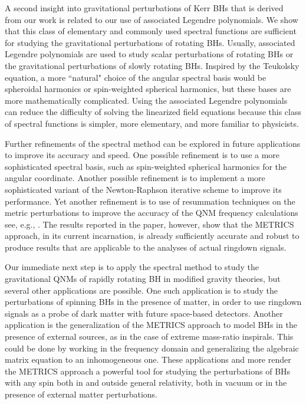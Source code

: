 \documentclass[aps,prx,amsmath,floats,floatfix,twocolumn,
  superscriptaddress,nofootinbib,showpacs]{revtex4-1}
\begin{document}
A second insight into gravitational perturbations of Kerr BHs that is derived from our work is related to our use of associated Legendre polynomials. We show that this class of elementary and commonly used spectral functions are sufficient for studying the gravitational perturbations of rotating BHs. 
Usually, associated Legendre polynomials are used to study scalar perturbations of rotating BHs or the gravitational perturbations of slowly rotating BHs. 
Inspired by the Teukolsky equation, a more ``natural" choice of the angular spectral basis would be spheroidal harmonics or spin-weighted spherical 
harmonics, but these bases are more mathematically complicated. 
Using the associated Legendre polynomials can reduce the difficulty of solving the linearized field equations because this class of spectral functions is simpler, more elementary, and more familiar to physicists.


Further refinements of the spectral method can be explored in future applications to improve its accuracy and speed. 
One possible refinement is to use a more sophisticated spectral basis, such as spin-weighted spherical
harmonics for the angular coordinate. 
Another possible refinement is to implement a more sophisticated variant of the Newton-Raphson iterative scheme to improve its performance. 
Yet another refinement is to use of resummation techniques on the metric perturbations to improve the accuracy of the QNM frequency calculations see, e.g., \cite{QNM_EdGB_03}. 
The results reported in the paper, however, show that the METRICS approach, in its current incarnation, is already sufficiently accurate and robust to produce results that are applicable to the analyses of actual ringdown signals.


Our immediate next step is to apply the spectral method to study the gravitational QNMs of rapidly rotating BH in modified gravity theories, but several other applications are possible. 
One such application is to study the perturbations of spinning BHs in the presence of matter, in order to use ringdown signals as a probe of dark matter with future space-based detectors. 
Another application is the generalization of the METRICS approach to model BHs in the presence of external sources, as in the case of extreme mass-ratio inspirals. This could be done by working in the frequency domain and generalizing the algebraic matrix equation to an inhomogeneous one. 
These applications and more render the METRICS approach a powerful tool for studying the perturbations of BHs with any spin both in and outside general relativity, both in vacuum or in the presence of external matter perturbations. 
\end{document}
